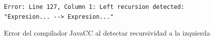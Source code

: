\begin{figure}[H]
\centering
\begin{lstlisting}
Error: Line 127, Column 1: Left recursion detected: "Expresion... --> Expresion..."
\end{lstlisting}
\caption{\label{fig:errorrecursividad}Error del compilador JavaCC al detectar recursividad a la izquierda}
\end{figure}








